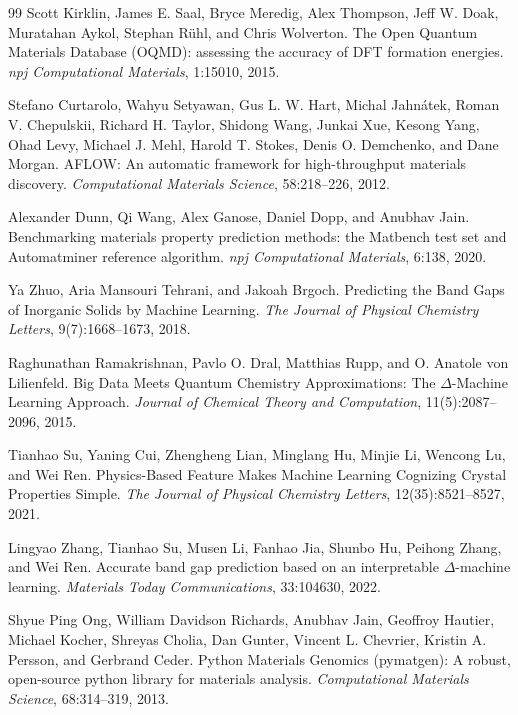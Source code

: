 \documentclass[a4paper,11pt]{article}
\begin{document}
\begin{thebibliography}{99}
Scott Kirklin, James E. Saal, Bryce Meredig, Alex Thompson, Jeff W. Doak, Muratahan Aykol, Stephan R\"uhl, and Chris Wolverton.
\newblock The Open Quantum Materials Database (OQMD): assessing the accuracy of DFT formation energies.
\newblock \emph{npj Computational Materials}, 1:15010, 2015.

Stefano Curtarolo, Wahyu Setyawan, Gus L. W. Hart, Michal Jahn\'atek, Roman V. Chepulskii, Richard H. Taylor, Shidong Wang, Junkai Xue, Kesong Yang, Ohad Levy, Michael J. Mehl, Harold T. Stokes, Denis O. Demchenko, and Dane Morgan.
\newblock AFLOW: An automatic framework for high-throughput materials discovery.
\newblock \emph{Computational Materials Science}, 58:218--226, 2012.

Alexander Dunn, Qi Wang, Alex Ganose, Daniel Dopp, and Anubhav Jain.
\newblock Benchmarking materials property prediction methods: the Matbench test set and Automatminer reference algorithm.
\newblock \emph{npj Computational Materials}, 6:138, 2020.

Ya Zhuo, Aria Mansouri Tehrani, and Jakoah Brgoch.
\newblock Predicting the Band Gaps of Inorganic Solids by Machine Learning.
\newblock \emph{The Journal of Physical Chemistry Letters}, 9(7):1668--1673, 2018.

Raghunathan Ramakrishnan, Pavlo O. Dral, Matthias Rupp, and O. Anatole von Lilienfeld.
\newblock Big Data Meets Quantum Chemistry Approximations: The \(\Delta\)-Machine Learning Approach.
\newblock \emph{Journal of Chemical Theory and Computation}, 11(5):2087--2096, 2015.

Tianhao Su, Yaning Cui, Zhengheng Lian, Minglang Hu, Minjie Li, Wencong Lu, and Wei Ren.
\newblock Physics-Based Feature Makes Machine Learning Cognizing Crystal Properties Simple.
\newblock \emph{The Journal of Physical Chemistry Letters}, 12(35):8521--8527, 2021.

Lingyao Zhang, Tianhao Su, Musen Li, Fanhao Jia, Shunbo Hu, Peihong Zhang, and Wei Ren.
\newblock Accurate band gap prediction based on an interpretable \(\Delta\)-machine learning.
\newblock \emph{Materials Today Communications}, 33:104630, 2022.

Shyue Ping Ong, William Davidson Richards, Anubhav Jain, Geoffroy Hautier, Michael Kocher, Shreyas Cholia, Dan Gunter, Vincent L. Chevrier, Kristin A. Persson, and Gerbrand Ceder.
\newblock Python Materials Genomics (pymatgen): A robust, open-source python library for materials analysis.
\newblock \emph{Computational Materials Science}, 68:314--319, 2013.


\end{thebibliography}
\end{document}
